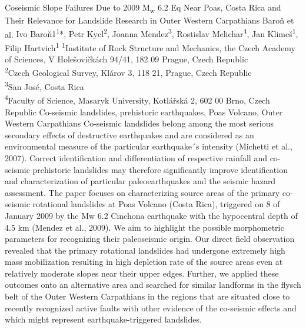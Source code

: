 \abstract
{Coseismic Slope Failures Due to 2009 M\textsubscript{w} 6.2 Eq Near Poas, Costa Rica and Their Relevance for Landslide Research in Outer Western Carpathians} 
{Baroň et al.} 
{Ivo Baroň1\textsuperscript{1}*, Petr Kycl\textsuperscript{2}, Joanna Mendez\textsuperscript{3}, Rostislav Melichar\textsuperscript{4}, Jan Klimeš\textsuperscript{1}, Filip Hartvich\textsuperscript{1}} 
{\TLtag} 
{
\textsuperscript{1}Institute of Rock Structure and Mechanics, the Czech Academy of Sciences, V Holešovičkách 94/41, 182 09 Prague, Czech Republic\\
\textsuperscript{2}Czech Geological Survey, Klárov 3, 118 21, Prague, Czech Republic\\
\textsuperscript{3}San José, Costa Rica\\
\textsuperscript{4}Faculty of Science, Masaryk University, Kotlářská 2, 602 00 Brno, Czech Republic
}
{}  %
{Co-seismic landslides, prehistoric earthquakes, Poas Volcano, Outer Western Carpathians}
{Co-seismic landslides belong among the most serious secondary effects of destructive earthquakes and are considered as an environmental measure of the particular earthquake´s intensity (Michetti et al., 2007). Correct identification and differentiation of respective rainfall and co-seismic prehistoric landslides may therefore significantly improve identification and characterization of particular paleoearthquakes and the seismic hazard assessment. The paper focuses on characterizing source areas of the primary co-seismic rotational landslides at Poas Volcano (Costa Rica), triggered on 8 of January 2009 by the Mw 6.2 Cinchona earthquake with the hypocentral depth of 4.5 km (Mendez et al., 2009). We aim to highlight the possible morphometric parameters for recognizing their paleoseismic origin. Our direct field observation revealed that the primary rotational landslides had undergone extremely high mass mobilization resulting in high depletion rate of the source areas even at relatively moderate slopes near their upper edges. Further, we applied these outcomes onto an alternative area and searched for similar landforms in the flysch belt of the Outer Western Carpathians in the regions that are situated close to recently recognized active faults with other evidence of the co-seismic effects and which might represent earthquake-triggered landslides.
}
